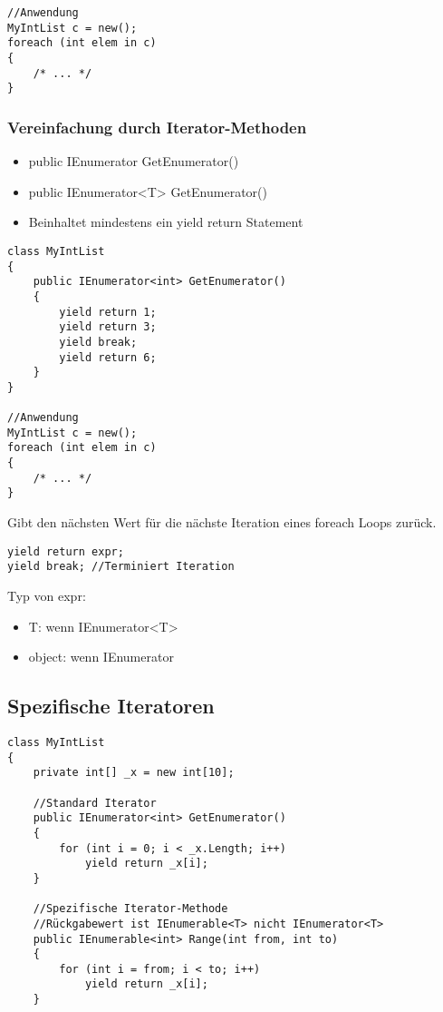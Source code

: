 \begin{multicols*}{2}
\begin{lstlisting}
//Anwendung
MyIntList c = new();
foreach (int elem in c)
{
    /* ... */
}
\end{lstlisting}
\subsubsection{Vereinfachung durch Iterator-Methoden}
\begin{itemize}
    \item public IEnumerator GetEnumerator()
    \item public IEnumerator<T> GetEnumerator()
    \item Beinhaltet mindestens ein yield return Statement
\end{itemize}
\begin{lstlisting}
class MyIntList 
{
    public IEnumerator<int> GetEnumerator()
    {
        yield return 1;
        yield return 3;
        yield break;
        yield return 6;
    }
}

//Anwendung
MyIntList c = new();
foreach (int elem in c)
{
    /* ... */
}

\end{lstlisting}
Gibt den nächsten Wert für die nächste Iteration eines foreach Loops zurück.
\begin{lstlisting}
yield return expr;  
yield break; //Terminiert Iteration  
\end{lstlisting}
Typ von expr:
\begin{itemize}
    \item T: wenn IEnumerator<T>
    \item object: wenn IEnumerator
\end{itemize}
\subsection{Spezifische Iteratoren}
\begin{lstlisting}
class MyIntList 
{
    private int[] _x = new int[10];
    
    //Standard Iterator
    public IEnumerator<int> GetEnumerator() 
    {
        for (int i = 0; i < _x.Length; i++)
            yield return _x[i];
    }
    
    //Spezifische Iterator-Methode
    //Rückgabewert ist IEnumerable<T> nicht IEnumerator<T>
    public IEnumerable<int> Range(int from, int to) 
    { 
        for (int i = from; i < to; i++)
            yield return _x[i];
    }
    

\end{lstlisting}
\end{multicols*}
